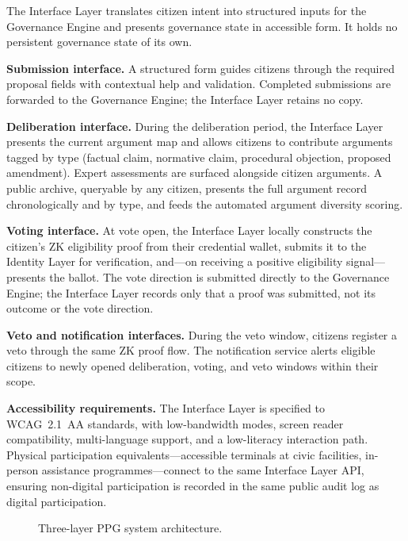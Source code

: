 \documentclass[12pt,a4paper,oneside]{report}
\begin{document}
The Interface Layer translates citizen intent into structured inputs for the Governance Engine and presents governance state in accessible form. It holds no persistent governance state of its own.

\textbf{Submission interface.} A structured form guides citizens through the required proposal fields with contextual help and validation. Completed submissions are forwarded to the Governance Engine; the Interface Layer retains no copy.

\textbf{Deliberation interface.} During the deliberation period, the Interface Layer presents the current argument map and allows citizens to contribute arguments tagged by type (factual claim, normative claim, procedural objection, proposed amendment). Expert assessments are surfaced alongside citizen arguments. A public archive, queryable by any citizen, presents the full argument record chronologically and by type, and feeds the automated argument diversity scoring.

\textbf{Voting interface.} At vote open, the Interface Layer locally constructs the citizen's ZK eligibility proof from their credential wallet, submits it to the Identity Layer for verification, and---on receiving a positive eligibility signal---presents the ballot. The vote direction is submitted directly to the Governance Engine; the Interface Layer records only that a proof was submitted, not its outcome or the vote direction.

\textbf{Veto and notification interfaces.} During the veto window, citizens register a veto through the same ZK proof flow. The notification service alerts eligible citizens to newly opened deliberation, voting, and veto windows within their scope.

\textbf{Accessibility requirements.} The Interface Layer is specified to WCAG~2.1~AA standards, with low-bandwidth modes, screen reader compatibility, multi-language support, and a low-literacy interaction path. Physical participation equivalents---accessible terminals at civic facilities, in-person assistance programmes---connect to the same Interface Layer API, ensuring non-digital participation is recorded in the same public audit log as digital participation.

\begin{figure}[htbp]
\centering
{}
\caption{Three-layer PPG system architecture.}
\label{fig:architecture}
\end{figure}
\end{document}
